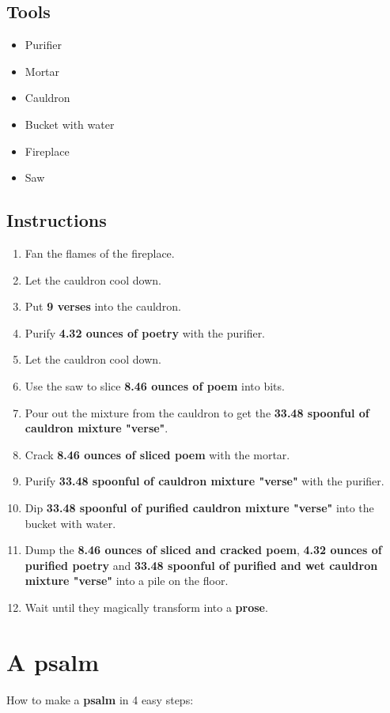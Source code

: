 \documentclass{article}
\begin{document}
\subsection{Tools}\begin{itemize}
\item 
Purifier
\item 
Mortar
\item 
Cauldron
\item 
Bucket with water
\item 
Fireplace
\item 
Saw
\end{itemize}
\subsection{Instructions}\begin{enumerate}
\item 
Fan the flames of the fireplace.
\item 
Let the cauldron cool down.
\item 
Put \textbf{9 verses} into the cauldron.
\item 
Purify \textbf{4.32 ounces of poetry} with the purifier.
\item 
Let the cauldron cool down.
\item 
Use the saw to slice \textbf{8.46 ounces of poem} into bits.
\item 
Pour out the mixture from the cauldron to get the \textbf{33.48 spoonful of cauldron mixture "verse"}.
\item 
Crack \textbf{8.46 ounces of sliced poem} with the mortar.
\item 
Purify \textbf{33.48 spoonful of cauldron mixture "verse"} with the purifier.
\item 
Dip \textbf{33.48 spoonful of purified cauldron mixture "verse"} into the bucket with water.
\item 
Dump the \textbf{8.46 ounces of sliced and cracked poem}, \textbf{4.32 ounces of purified poetry} and \textbf{33.48 spoonful of purified and wet cauldron mixture "verse"} into a pile on the floor.
\item 
Wait until they magically transform into a \textbf{prose}.
\end{enumerate}
\newpage
\section{A psalm}How to make a \textbf{psalm} in 4 easy steps:
\end{document}
